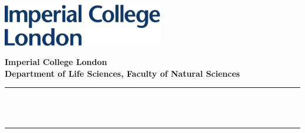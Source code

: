 \begin{titlepage}

    \newcommand{\HRule}{\rule{\linewidth}{0.5mm}} %


    \includegraphics[width=7cm]{./img/logo-eps-converted-to.pdf}\\[1cm]


    \center %



    \textbf{\large Imperial College London}\\[0.8 cm] %
    \textbf{\large Department of Life Sciences, Faculty of Natural Sciences}\\[0.8 cm] %
    \makeatletter
    \vspace*{1cm}
    \HRule \\[0.6cm]
    { \huge \textbf \@title}\\ %
    \HRule \\[2cm]


\end{titlepage}

